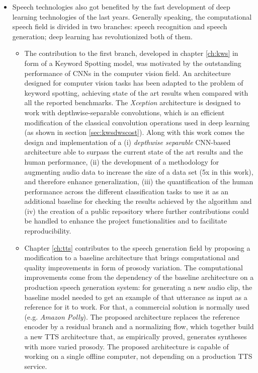 \begin{itemize}
\item Speech technologies also got benefited by the fast development of deep learning technologies of the last years. Generally speaking, the computational speech field is divided in two branches: speech recognition and speech generation; deep learning has revolutionized both of them. 
	\begin{itemize}
		\item The contribution to the first branch, developed in chapter \ref{ch:kws} in form of a Keyword Spotting model, was motivated by the outstanding performance of CNNs in the computer vision field. An architecture designed for computer vision tasks has been adapted to the problem of keyword spotting, achieving state of the art results when compared with all the reported benchmarks. The \textit{Xception} architecture is designed to work with depthwise-separable convolutions, which is an efficient modification of the classical convolution operations used in deep learning (as shown in section \ref{sec:kwsdwscost}). Along with this work comes the design and implementation of a (i) \textit{depthwise separable} CNN-based architecture able to surpass the current state of the art results and the human performance, (ii) the development of a methodology for augmenting audio data to increase the size of a data set (5x in this work), and therefore enhance generalization, (iii) the quantification of the human performance across the different classification tasks to use it as an additional baseline for checking the results achieved by the algorithm and (iv) the creation of a public repository where further contributions could be handled to enhance the project functionalities and to facilitate reproducibility.
		\item Chapter \ref{ch:tts} contributes to the speech generation field by proposing a modification to a baseline architecture that brings computational and quality improvements in form of prosody variation. The computational improvements come from the dependency of the baseline architecture on a production speech generation system: for generating a new audio clip, the baseline model needed to get an example of that utterance as input as a reference for it to work. For that, a commercial solution is normally used (e.g. \textit{Amazon Polly}). The proposed architecture replaces the reference encoder by a residual branch and a normalizing flow, which together build a new TTS architecture that, as empirically proved, generates syntheses with more varied prosody. The proposed architecture is capable of working on a single offline computer, not depending on a production TTS service. 
	\end{itemize}
\end{itemize}

